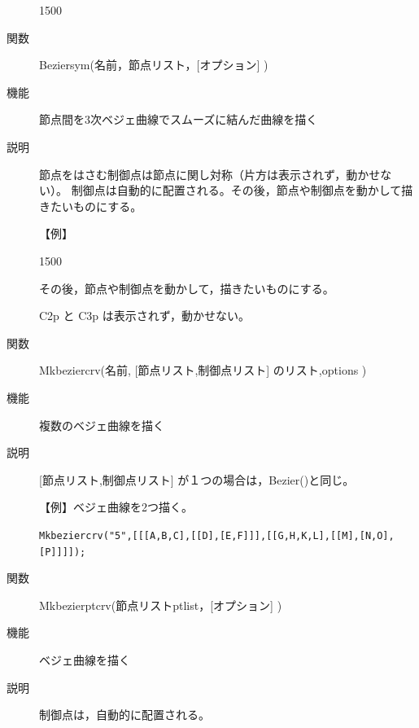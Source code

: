 \documentclass[papersize,a4paper,12pt,uplatex]{jsarticle}
\begin{document}
\begin{description}
\begin{layer}{150}{0}
\end{layer}

\vspace{40mm}

\vspace{\baselineskip}
\hypertarget{beziersym}{}
\item[関数]  Beziersym(名前，節点リスト，[オプション] )
\item[機能]  節点間を3次ベジェ曲線でスムーズに結んだ曲線を描く
\item[説明]  節点をはさむ制御点は節点に関し対称（片方は表示されず，動かせない）。
制御点は自動的に配置される。その後，節点や制御点を動かして描きたいものにする。

【例】

\begin{layer}{150}{0}
\end{layer}

\vspace{50mm}

その後，節点や制御点を動かして，描きたいものにする。

C2p と C3p は表示されず，動かせない。
\begin{center}  \end{center}

\vspace{\baselineskip}
\hypertarget{mkbeziercrv}{}
\item[関数]  Mkbeziercrv(名前, [節点リスト,制御点リスト] のリスト,options )
\item[機能]  複数のベジェ曲線を描く
\item[説明]  [節点リスト,制御点リスト] が１つの場合は，Bezier()と同じ。

\vspace{\baselineskip}
【例】ベジェ曲線を2つ描く。

\verb|Mkbeziercrv("5",[[[A,B,C],[[D],[E,F]]],[[G,H,K,L],[[M],[N,O],[P]]]]);|

 

\vspace{\baselineskip}
\hypertarget{mkbezierptcrv}{}
\item[関数]  Mkbezierptcrv(節点リストptlist，[オプション] )
\item[機能]  ベジェ曲線を描く
\item[説明]  制御点は，自動的に配置される。


\end{description}
\end{document}
